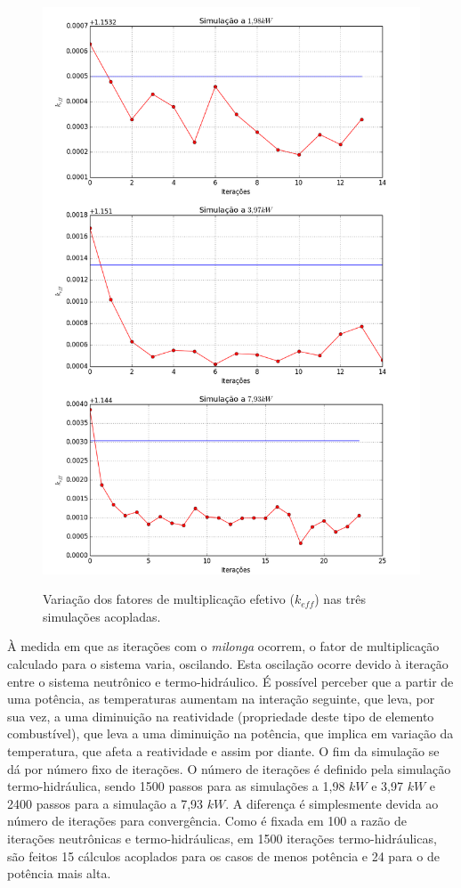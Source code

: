 \begin{figure}[htb]
  \caption{Variação dos fatores de multiplicação efetivo ($k_{eff}$) nas três simulações acopladas.}
  \centering\includegraphics[scale=0.5]{figuras/plot-demonio-vertical.png}
  \label{fig:keff_all}
\end{figure}

À medida em que as iterações com o \textit{milonga} ocorrem, o fator de multiplicação
calculado para o sistema varia, oscilando. Esta oscilação ocorre devido à iteração
entre o sistema neutrônico e termo-hidráulico. É possível perceber que a partir
de uma potência, as temperaturas aumentam na interação seguinte, que leva, por sua vez,
a uma diminuição na reatividade (propriedade deste tipo de elemento combustível),
que leva a uma diminuição na potência, que implica em variação da temperatura, que afeta
a reatividade e assim por diante. O fim da simulação se dá por número fixo
de iterações. O número de iterações é definido pela simulação termo-hidráulica, sendo
1500 passos para as simulações a 1,98 $kW$ e 3,97 $kW$ e 2400 passos para a simulação a
7,93 $kW$. A diferença é simplesmente devida ao número de iterações para convergência.
Como é fixada em 100 a razão de iterações neutrônicas e termo-hidráulicas, em 1500 iterações
termo-hidráulicas, são feitos 15 cálculos acoplados para os casos de menos potência e 24
para o de potência mais alta.

